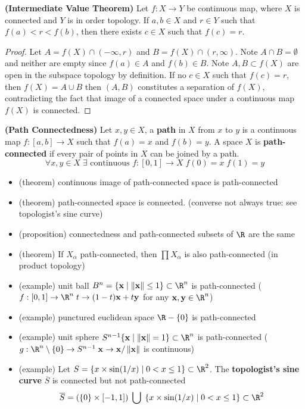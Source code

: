 \documentclass[10.5pt]{article}
\newcommand{\bx}{\mathbf{x}}
\newcommand{\by}{\mathbf{y}}
\renewcommand{\norm}[1]{\left\lVert#1\right\rVert}
\begin{document}
\begin{theorem*}
    \textbf{(Intermediate Value Theorem)} Let $f:X\to Y$ be continuous map, where $X$ is connected and $Y$ is in order topology. If $a,b \in X$ and $r\in Y$ such that $f(a) <  r < f(b)$, then there exists $c\in X$ such that $f(c) = r$.
    \begin{proof}
        Let $A = f(X) \cap (-\infty, r)$ and $B = f(X) \cap (r, \infty)$. Note $A\cap B=\emptyset$ and neither are empty since $f(a)\in A$ and $f(b)\in B$. Note $A,B \subset f(X)$ are open in the subspace topology by definition. If no $c\in X$ such that $f(c) = r$, then $f(X) = A \cup B$ then $(A,B)$ constitutes a separation of $f(X)$, contradicting the fact that image of a connected space under a continuous map $f(X)$ is connected.
    \end{proof}
\end{theorem*}

\begin{defn*}
    \textbf{(Path Connectedness)} Let $x,y\in X$, a \textbf{path} in $X$ from $x$ to $y$ is a continuous map $f:[a,b] \to X$ such that $f(a) = x$ and $f(b) = y$. A space $X$ is \textbf{path-connected} if every pair of points in $X$ can be joined by a path.
    \[
        \forall x,y\in X \; \exists \text{ continuous } f:[0,1] \to X \; f(0)=x \; f(1)=y
    \]
    \begin{itemize}
        \item (theorem) continuous image of path-connected space is path-connected
        \item (theorem) path-connected space is connected. (converse not always true: see topologist's sine curve)
        \item (proposition) connectedness and path-connected subsets of $\R$ are the same
        \item (theorem) If $X_{\alpha}$ path-connected, then $\textstyle \prod X_{\alpha}$ is also path-connected (in product topology) 
        \item (example) unit ball $B^n = \{\bx \mid \norm{\bx} \leq 1 \} \subset \R^n$ is path-connected ($f:[0,1]\to \R^n \; t \to (1-t)\bx + t\by$ for any $\bx,\by \in \R^n$)
        \item (example) punctured euclidean space $\R - \{0\}$ is path-connected
        \item (example) unit sphere $S^{n-1} \{\bx \mid \norm{\bx} = 1\} \subset \R^n$ is path-connected ($g: \R^n \setminus \{0\} \to S^{n-1} \; \bx \to \bx / \norm{\bx}$ is continuous)
        \item (example) Let $S = \{x\times \sin (1/x) \mid 0 < x \leq 1 \} \subset \R^2$. The \textbf{topologist's sine curve} $\overline{S}$ is connected but not path-connected
        \[
            \overline{S} = \left(\{0\} \times [-1,1]\right) \;\bigcup\; \left\{x\times \sin (1/x) \mid 0 < x \leq 1 \right\} \subset \R^2
        \]
    \end{itemize}
\end{defn*}
\end{document}
